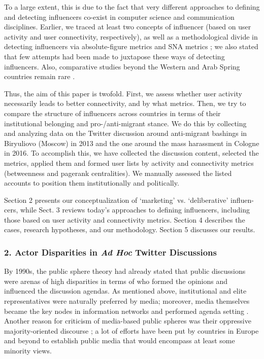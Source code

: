 To a large extent, this is due to the fact that very different approaches to defining and detecting influencers co-exist in computer science and communication disciplines. Earlier, we traced at least two concepts of influencer (based on user activity and user connectivity, respectively), as well as a methodological divide in detecting influencers via absolute-figure metrics and SNA metrics \cite{BodrunovaLitvinenkoBlekanov2016}; we also stated that few attempts had been made to juxtapose these ways of detecting influencers. Also, comparative studies beyond the Western and Arab Spring countries remain rare \cite{HladikStetka}.

Thus, the aim of this paper is twofold. First, we assess whether user activity necessarily leads to better connectivity, and by what metrics. Then, we try to compare the structure of influencers across countries in terms of their institutional belonging and pro-/anti-migrant stance. We do this by collecting and analyzing data on the Twitter discussion around anti-migrant bashings in Biryuliovo (Moscow) in 2013 and the one around the mass harassment in Cologne in 2016. To accomplish this, we have collected the discussion content, selected the metrics, applied them and formed user lists by activity and connectivity metrics (betweenness and pagerank centralities). We manually assessed the listed accounts to position them institutionally and politically.

Section 2 presents our conceptualization of ‘marketing’ vs. ‘deliberative’ influen- cers, while Sect. 3 reviews today’s approaches to defining influencers, including those based on user activity and connectivity metrics. Section 4 describes the cases, research hypotheses, and our methodology. Section 5 discusses our results.

\subsubsection{2. Actor Disparities in \textit{Ad Hoc} Twitter Discussions}

By 1990s, the public sphere theory had already stated that public discussions were arenas of high disparities in terms of who formed the opinions and influenced the discussion agendas. As mentioned above, institutional and elite representatives were naturally preferred by media; moreover, media themselves became the key nodes in information networks and performed agenda setting \cite{McCombsShaw,McCombs}. Another reason for criticism of media-based public spheres was their oppressive majority-oriented discourse \cite{Fraser,LaclauMouffe,FentonDowney,Dahlberg}; a lot of efforts have been put by countries in Europe and beyond to establish public media that would encompass at least some minority views.

